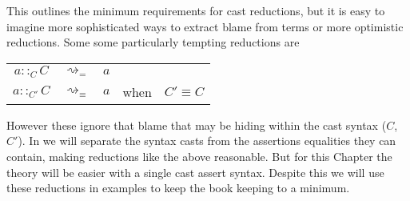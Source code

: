 This outlines the minimum requirements for cast reductions, but it is easy to imagine more sophisticated ways to extract blame from terms or more optimistic reductions.
Some some particularly tempting reductions are

\begin{tabular}{ccccc}
$a::_{C}C$ & $\rightsquigarrow_{=}$ & $a$ &  & \tabularnewline
$a::_{C'}C$ & $\rightsquigarrow_{\equiv}$ & $a$ & when & $C'\equiv C$\tabularnewline
\end{tabular}

However these ignore that blame that may be hiding within the cast syntax ($C$, $C'$).
In  we will separate the syntax casts from the assertions equalities they can contain, making reductions like the above reasonable.
But for this Chapter the theory will be easier with a single cast assert syntax.
Despite this we will use these reductions in examples to keep the book keeping to a minimum.





